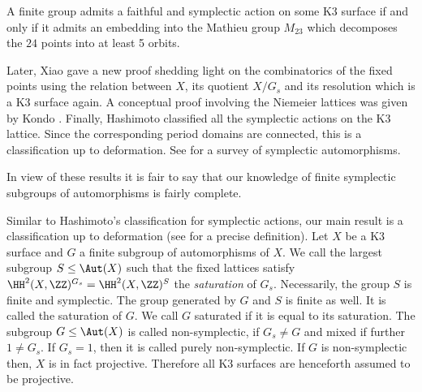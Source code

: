 \begin{theorem}
A finite group admits a faithful and symplectic action on some K3 surface if and only if it admits an embedding into the Mathieu group $M_{23}$ which decomposes the $24$ points into at least 5 orbits.
\end{theorem}

Later, Xiao \cite{Xiao} gave a new proof shedding light on the combinatorics of the fixed points using the relation between
$X$, its quotient $X/G_s$ and its resolution which is a K3 surface again.
A conceptual proof involving the Niemeier lattices was given by Kondo \cite{kondo1998}.
Finally, Hashimoto \cite{Hashimoto2012} classified all the symplectic actions on the K3 lattice. Since the corresponding period domains are connected, this is a classification up to deformation.
See \cite{kondo2018} for a survey of symplectic automorphisms.

In view of these results it is fair to say that our knowledge of finite symplectic subgroups of automorphisms is fairly complete.


Similar to Hashimoto's classification for symplectic actions, our main result is a classification up to deformation (see  for a precise definition).
Let $X$ be a K3 surface and $G$ a finite subgroup of  automorphisms of $X$.
We call the largest subgroup $S \leq \Aut(X)$ such that the fixed lattices satisfy $\HH^2(X,\ZZ)^{G_s}=\HH^2(X,\ZZ)^{S}$ the \emph{saturation} of $G_s$.
Necessarily, the group $S$ is finite and symplectic. The group generated by $G$ and $S$ is finite as well. It is called the saturation of $G$.
We call $G$ saturated if it is equal to its saturation.
The subgroup $G \leq \Aut(X)$ is called non-symplectic, if $G_s \neq G$ and mixed if further $1\neq G_s$. If $G_s=1$, then it is called purely non-symplectic. If $G$ is non-symplectic then, $X$ is in fact projective. Therefore all K3 surfaces are henceforth assumed to be projective.

